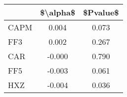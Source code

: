 \begin{tabular}{lcc}
\toprule
{} &  \$\textbackslash alpha\$ &  \$Pvalue\$ \\
\midrule
CAPM &     0.004 &     0.073 \\
FF3  &     0.002 &     0.267 \\
CAR  &    -0.000 &     0.790 \\
FF5  &    -0.003 &     0.061 \\
HXZ  &    -0.004 &     0.036 \\
\bottomrule
\end{tabular}
